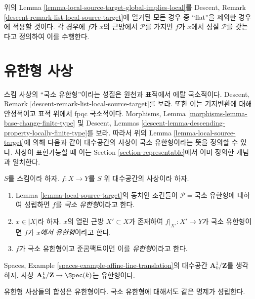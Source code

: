 \begin{remark}
\label{remark-when-apply}
위의 Lemma
\ref{lemma-local-source-target-global-implies-local}를
Descent, Remark \ref{descent-remark-list-local-source-target}에
열거된 모든 경우 중 “flat”을 제외한 경우에 적용할 것이다.
각 경우에 $f$가 $x$의 근방에서 $\mathcal{P}$를 가지면
$f$가 $x$에서 성질 $\mathcal{P}$를 갖는다고 정의하여 이를
수행한다.
\end{remark}

\section{유한형 사상}
\label{section-finite-type}

\noindent
스킴 사상의 “국소 유한형”이라는 성질은 원천과 표적에서
에탈 국소적이다. Descent, Remark
\ref{descent-remark-list-local-source-target}를 보라.
또한 이는 기저변환에 대해 안정적이고 표적 위에서 fpqc 국소적이다.
Morphisms, Lemma \ref{morphisms-lemma-base-change-finite-type} 및
Descent, Lemmas
\ref{descent-lemma-descending-property-locally-finite-type}를 보라.
따라서 위의 Lemma \ref{lemma-local-source-target}에 의해 다음과
같이 대수공간의 사상이 국소 유한형이라는 뜻을 정의할 수 있다.
사상이 표현가능할 때 이는 Section \ref{section-representable}에서
이미 정의한 개념과 일치한다.

\begin{definition}
\label{definition-locally-finite-type}
$S$를 스킴이라 하자.
$f : X \to Y$를 $S$ 위 대수공간의 사상이라 하자.
\begin{enumerate}
\item Lemma \ref{lemma-local-source-target}의 동치인 조건들이
$\mathcal{P} = \text{국소 유한형}$에 대하여 성립하면
$f$를 {\it 국소 유한형}이라고 한다.
\item $x \in |X|$라 하자. $x$의 열린 근방 $X' \subset X$가
존재하여 $f|_{X'} : X' \to Y$가 국소 유한형이면
$f$가 {\it $x$에서 유한형}이라고 한다.
\item $f$가 국소 유한형이고 준콤팩트이면
이를 {\it 유한형}이라고 한다.
\end{enumerate}
\end{definition}

\noindent
Spaces, Example \ref{spaces-example-affine-line-translation}의
대수공간 $\mathbf{A}^1_k/\mathbf{Z}$를 생각하자.
사상 $\mathbf{A}^1_k/\mathbf{Z} \to \Spec(k)$는 유한형이다.

\begin{lemma}
\label{lemma-composition-finite-type}
유한형 사상들의 합성은 유한형이다.
국소 유한형에 대해서도 같은 명제가 성립한다.
\end{lemma}

